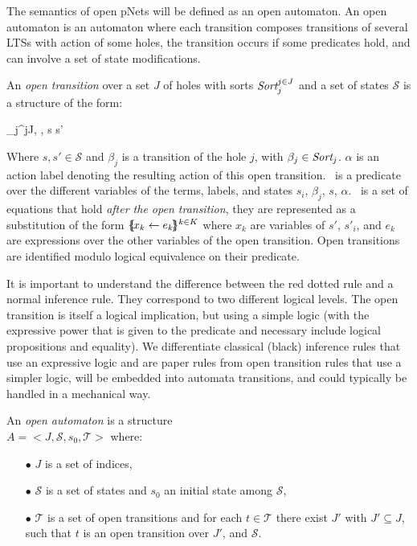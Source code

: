 \documentclass{lncs/llncs}
\newcommand{\TODO}[1]{\textcolor{red}{\textbf{[TODO:#1]}}}
\begin{document}
The semantics of open pNets will be defined  as an open automaton. An open
automaton is an automaton where each transition composes transitions of several LTSs with
action of some holes, the transition occurs if some predicates hold, and can involve a 
set of state modifications.
\begin{definition}
	\label{def:OpenTransitions}
	An \emph{open transition} over a
	set $J$ of holes with sorts $\Sort_j^{j\in J}$ and a set of states $\mathcal{S}$ is 
	a structure of the form:	
	\begin{mathpar}
	\openrule
	{	\beta_j^{j\in J}, \Pred, \Post}
	{s \OTarrow {\alpha}s'}
	\end{mathpar}
	Where $s, s'\in\mathcal{S}$ and $\beta_j$
        is a transition of the hole $j$, with $\beta_j\in\Sort_j$. $\alpha$ is an action 
        label denoting the resulting action
        of this open transition. \Pred\ is a predicate 
	over the different variables of the
	terms, labels, and states $s_i$, $\beta_j$, $s$, $\alpha$. \Post\ is a set of 
	equations 
	that 
	hold \emph{after the open transition}, they are represented as a substitution of the 
	form $\{\hspace{-0.88ex}\{\!x_k\gets e_k\!\}\hspace{-0.87ex}\}^{k\in K}$ 
	where $x_k$ are variables of $s'$, $s'_i$, and $e_k$ are expressions over the other 
	variables of the open transition. Open transitions are identified modulo logical equivalence on their predicate.
\end{definition}


It is important to understand the difference between the red dotted rule and a normal 
inference rule. They correspond to two different logical levels.
 The open transition is itself a logical implication, but using a simple logic (with the 
 expressive power that is given to the predicate and necessary include logical 
 propositions and equality). We differentiate classical (black) inference rules that use 
 an expressive logic and are paper rules from open transition rules that use a simpler 
 logic, 
 will be embedded into automata transitions, and could typically be handled in a 
 mechanical way.

\begin{definition}
	\label{def:open-automaton}
	An \emph{open automaton} is a structure\\ $A =
	<J,\mathcal{S},s_0,\mathcal{T}>$ where:
	\begin{itemize}
		\item[$\bullet$]   $J$ is a  set of indices,
		\item[$\bullet$]   $\mathcal{S}$ is a set of states and $s_0$ an initial state
		among $\mathcal{S}$,
		\item[$\bullet$] $\mathcal{T}$ is a set of open transitions and for each
		$t\in \mathcal{T}$ there exist  $J'$ with  $J'
		\subseteq J$, such that $t$ is an open transition over  $J'$,
		and  $\mathcal{S}$.
		
	\end{itemize}
\end{definition}
	
\end{document}

